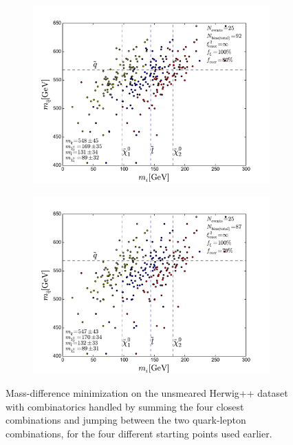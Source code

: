 \documentclass[twoside,english]{uiofysmaster}
\begin{document}
\begin{figure}[hbt]
	\begin{subfigure}[b]{0.45\textwidth}
		\includegraphics[width=\textwidth]{figures/improving_combinatorics/herwigpp-4combosum-fit-jump_comb-nosmear-nocut-800-500-300-50.pdf} 
		\caption{ }
	\end{subfigure}
	\begin{subfigure}[b]{0.45\textwidth}
		\includegraphics[width=\textwidth]{figures/improving_combinatorics/herwigpp-4combosum-fit-jump_comb-nosmear-nocut-1000-100-80-30.pdf}
		\caption{ } 
	\end{subfigure}
	\caption{Mass-difference minimization on the unsmeared Herwig++ dataset with combinatorics handled by summing the four closest combinations and jumping between the two quark-lepton combinations, for the four different starting points used earlier.}
	\label{fig:4combosum_starting_point_sensitivity_combinatorics-jumping}
\end{figure}
\end{document}
